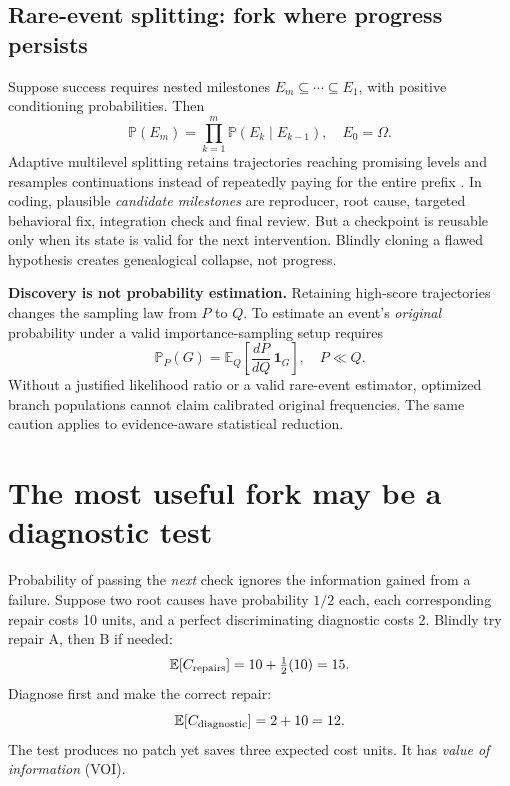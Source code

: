\documentclass[10pt,twocolumn]{article}
\newcommand{\Pp}{\mathbb P}
\newcommand{\Ee}{\mathbb E}
\newcommand{\claim}[1]{\textbf{\color{accent}#1}}
\begin{document}
\subsection{Rare-event splitting: fork where progress persists}
Suppose success requires nested milestones $E_m\subseteq\cdots\subseteq E_1$, with positive conditioning probabilities. Then
\begin{equation}\label{eq:split}
\Pp(E_m)=\prod_{k=1}^m\Pp(E_k\mid E_{k-1}),
\quad E_0=\Omega.
\end{equation}
Adaptive multilevel splitting retains trajectories reaching promising levels and resamples continuations instead of repeatedly paying for the entire prefix \cite{ams}. In coding, plausible \emph{candidate milestones} are reproducer, root cause, targeted behavioral fix, integration check and final review. But a checkpoint is reusable only when its state is valid for the next intervention. Blindly cloning a flawed hypothesis creates genealogical collapse, not progress.

\claim{Discovery is not probability estimation.} Retaining high-score trajectories changes the sampling law from $P$ to $Q$. To estimate an event's \emph{original} probability under a valid importance-sampling setup requires
\begin{equation}\label{eq:iw}
\Pp_P(G)=\Ee_Q\!\left[\frac{dP}{dQ}\,\mathbf1_G\right],\quad P\ll Q.
\end{equation}
Without a justified likelihood ratio or a valid rare-event estimator, optimized branch populations cannot claim calibrated original frequencies. The same caution applies to evidence-aware statistical reduction.

\section{The most useful fork may be a diagnostic test}

Probability of passing the \emph{next} check ignores the information gained from a failure. Suppose two root causes have probability $1/2$ each, each corresponding repair costs 10 units, and a perfect discriminating diagnostic costs 2. Blindly try repair A, then B if needed:
\[
\Ee[C_{\rm repairs}]=10+\tfrac12(10)=15.
\]
Diagnose first and make the correct repair:
\[
\Ee[C_{\rm diagnostic}]=2+10=12.
\]
The test produces no patch yet saves three expected cost units. It has \emph{value of information} (VOI).
\end{document}
